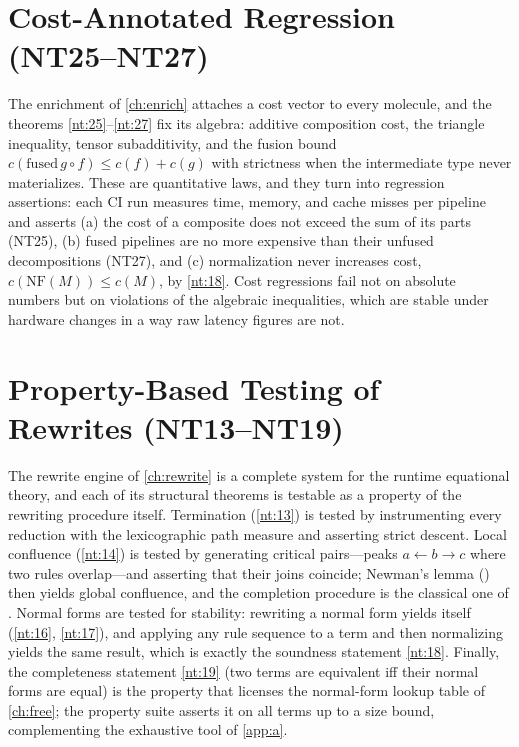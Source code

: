 \section{Cost-Annotated Regression (NT25--NT27)}
The enrichment of \autoref{ch:enrich} attaches a cost vector to every molecule, and the theorems \ref{nt:25}--\ref{nt:27} fix its algebra: additive composition cost, the triangle inequality, tensor subadditivity, and the fusion bound $c(\mathrm{fused}\, g\circ f) \le c(f)+c(g)$ with strictness when the intermediate type never materializes. These are quantitative laws, and they turn into regression assertions: each CI run measures time, memory, and cache misses per pipeline and asserts (a) the cost of a composite does not exceed the sum of its parts (NT25), (b) fused pipelines are no more expensive than their unfused decompositions (NT27), and (c) normalization never increases cost, $c(\mathrm{NF}(M)) \le c(M)$, by \ref{nt:18}. Cost regressions fail not on absolute numbers but on violations of the algebraic inequalities, which are stable under hardware changes in a way raw latency figures are not.

\section{Property-Based Testing of Rewrites (NT13--NT19)}
The rewrite engine of \autoref{ch:rewrite} is a complete system for the runtime equational theory, and each of its structural theorems is testable as a property of the rewriting procedure itself. Termination (\ref{nt:13}) is tested by instrumenting every reduction with the lexicographic path measure and asserting strict descent. Local confluence (\ref{nt:14}) is tested by generating critical pairs---peaks $a \gets b \to c$ where two rules overlap---and asserting that their joins coincide; Newman's lemma (\cite{newman}) then yields global confluence, and the completion procedure is the classical one of \cite{knuthbendix}. Normal forms are tested for stability: rewriting a normal form yields itself (\ref{nt:16}, \ref{nt:17}), and applying any rule sequence to a term and then normalizing yields the same result, which is exactly the soundness statement \ref{nt:18}. Finally, the completeness statement \ref{nt:19} (two terms are equivalent iff their normal forms are equal) is the property that licenses the normal-form lookup table of \autoref{ch:free}; the property suite asserts it on all terms up to a size bound, complementing the exhaustive tool of \autoref{app:a}.

